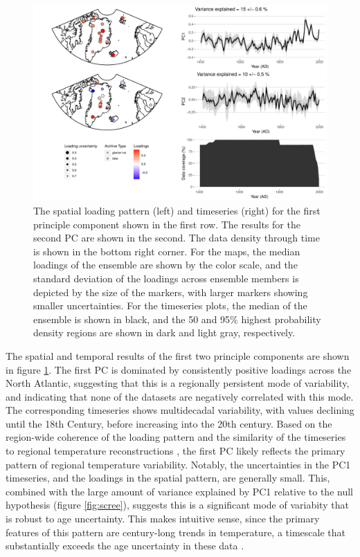 \documentclass[gchron, manuscript]{copernicus}
\begin{document}
\begin{figure}
\includegraphics[width=12cm]{geoChronR-paper_files/figure-latex/pca-1} \caption{The spatial loading pattern (left) and timeseries (right) for the first principle component shown in the first row. The results for the second PC are shown in the second. The data density through time is shown in the bottom right corner. For the maps, the median loadings of the ensemble are shown by the color scale, and the standard deviation of the loadings across ensemble members is depicted by the size of the markers, with larger markers showing smaller uncertainties. For the timeseries plots, the median of the ensemble is shown in black, and the 50 and 95\% highest probability density regions are shown in dark and light gray, respectively.}\label{fig:pca}
\end{figure}

The spatial and temporal results of the first two principle components are shown in figure \ref{fig:pca}.
The first PC is dominated by consistently positive loadings across the North Atlantic, suggesting that this is a regionally persistent mode of variability, and indicating that none of the datasets are negatively correlated with this mode.
The corresponding timeseries shows multidecadal variability, with values declining until the 18th Century, before increasing into the 20th century.
Based on the region-wide coherence of the loading pattern and the similarity of the timeseries to regional temperature reconstructions \citep{paico, McKayKaufman2014, werner2018arcticCFR}, the first PC likely reflects the primary pattern of regional temperature variability.
Notably, the uncertainties in the PC1 timeseries, and the loadings in the spatial pattern, are generally small.
This, combined with the large amount of variance explained by PC1 relative to the null hypothesis (figure \ref{fig:scree}), suggests this is a significant mode of variabity that is robust to age uncertainty.
This makes intuitive sense, since the primary features of this pattern are century-long trends in temperature, a timescale that substantially exceeds the age uncertainty in these data \citep{McKayKaufman2014}.
\end{document}

